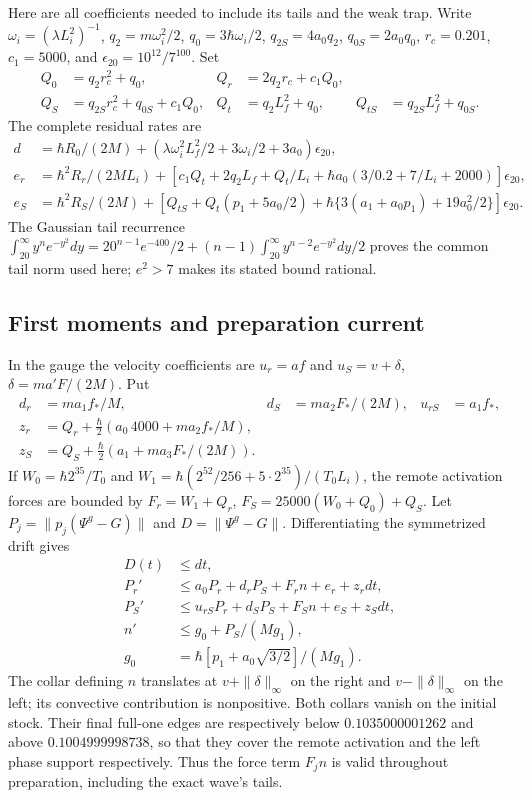 \documentclass[11pt]{article}
\theoremstyle{definition}\newtheorem{definition}[theorem]{Definition}
\theoremstyle{remark}\newtheorem{remark}[theorem]{Remark}
\begin{document}
Here are all coefficients needed to include its tails and the weak trap.
Write $\omega_i=(\lambda L_i^2)^{-1}$, $q_2=m\omega_i^2/2$,
$q_0=3\hbar\omega_i/2$, $q_{2S}=4a_0q_2$,
$q_{0S}=2a_0q_0$, $r_c=0.201$, $c_1=5000$, and
$\epsilon_{20}=10^{12}/7^{100}$. Set
\begin{align*}
 Q_0&=q_2r_c^2+q_0,&Q_r&=2q_2r_c+c_1Q_0,\\
 Q_S&=q_{2S}r_c^2+q_{0S}+c_1Q_0,&
 Q_t&=q_2L_f^2+q_0,& Q_{tS}&=q_{2S}L_f^2+q_{0S}.
\end{align*}
The complete residual rates are
\begin{align}
 d&=\hbar R_0/(2M)
 +(\lambda\omega_i^2L_f^2/2+3\omega_i/2+3a_0)\epsilon_{20},\\
 e_r&=\hbar^2R_r/(2ML_i)
 +[c_1Q_t+2q_2L_f+Q_t/L_i
       +\hbar a_0(3/0.2+7/L_i+2000)]\epsilon_{20},\\
 e_S&=\hbar^2R_S/(2M)
 +[Q_{tS}+Q_t(p_1+5a_0/2)
      +\hbar\{3(a_1+a_0p_1)+19a_0^2/2\}]\epsilon_{20}.
 \label{prep:source-rates}
\end{align}
The Gaussian tail recurrence
$\int_{20}^\infty y^n e^{-y^2}dy
=20^{n-1}e^{-400}/2+(n-1)\int_{20}^\infty y^{n-2}e^{-y^2}dy/2$
proves the common tail norm used here; $e^2>7$ makes its stated bound
rational.

\subsection{First moments and preparation current}\label{prep:first}
In the gauge the velocity coefficients are $u_r=af$ and
$u_S=v+\delta$, $\delta=ma'F/(2M)$. Put
\begin{align*}
 d_r&=ma_1f_*/M,&d_S&=ma_2F_*/(2M),& u_{rS}&=a_1f_*,\\
 z_r&=Q_r+\tfrac\hbar2(a_0\,4000+ma_2f_*/M),\\
 z_S&=Q_S+\tfrac\hbar2(a_1+ma_3F_*/(2M)).
\end{align*}
If $W_0=\hbar2^{35}/T_0$ and
$W_1=\hbar(2^{52}/256+5\cdot2^{35})/(T_0L_i)$, the remote
activation forces are bounded by
$F_r=W_1+Q_r$, $F_S=25000(W_0+Q_0)+Q_S$.
Let $P_j=\|p_j(\Psi^g-G)\|$ and $D=\|\Psi^g-G\|$.
Differentiating the symmetrized drift gives
\begin{align}
 D(t)&\le dt,\\
 P_r'&\le a_0P_r+d_rP_S+F_rn+e_r+z_rdt,\\
 P_S'&\le u_{rS}P_r+d_SP_S+F_Sn+e_S+z_Sdt,\\
 n'&\le g_0+P_S/(Mg_1),\\
 g_0&=\hbar[p_1+a_0\sqrt{3/2}]/(Mg_1). \label{prep:first-system}
\end{align}
The collar defining $n$ translates at $v+\|\delta\|_\infty$ on the
right and $v-\|\delta\|_\infty$ on the left; its convective contribution
is nonpositive. Both collars vanish on the initial stock. Their final
full-one edges are respectively below $0.1035000001262$ and above
$0.1004999998738$, so that they cover the remote activation and the
left phase support respectively. Thus the force term $F_jn$ is valid
throughout preparation, including the exact wave's tails.
\end{document}

